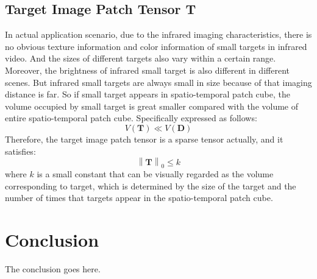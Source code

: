 \documentclass[journal]{IEEEtran}
\begin{document}
\subsection{Target Image Patch Tensor $\mathbf{T}$}
In actual application scenario, due to the infrared imaging characteristics, there is no obvious texture information and color information of small targets in infrared video. And the sizes of different targets also vary within a certain range. Moreover, the brightness of infrared small target is also different in different scenes. But infrared small targets are always small in size because of that imaging distance is far. So if small target appears in spatio-temporal patch cube, the volume occupied by small target is great smaller compared with the volume of entire spatio-temporal patch cube. Specifically expressed as follows:
\begin{equation}
  V(\bm{T}) \ll V(\bm{D})
\end{equation}
Therefore, the target image patch tensor is a sparse tensor actually, and it satisfies:
\begin{equation}
  \left \| \bm{T} \right \|_0 \leq k
\end{equation}
where $k$ is a small constant that can be visually regarded as the volume corresponding to target, which is determined by the size of the target and the number of times that targets appear in the spatio-temporal patch cube.




\section{Conclusion}
The conclusion goes here.






%
\end{document}
